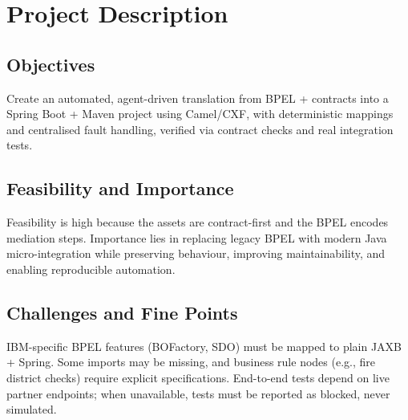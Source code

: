 \documentclass[11pt,a4paper]{article}
\begin{document}
\section{Project Description}
\subsection{Objectives}
Create an automated, agent-driven translation from BPEL + contracts into a Spring Boot + Maven project using Camel/CXF, with deterministic mappings and centralised fault handling, verified via contract checks and real integration tests.

\subsection{Feasibility and Importance}
Feasibility is high because the assets are contract-first and the BPEL encodes mediation steps. Importance lies in replacing legacy BPEL with modern Java micro-integration while preserving behaviour, improving maintainability, and enabling reproducible automation.

\subsection{Challenges and Fine Points}
IBM-specific BPEL features (BOFactory, SDO) must be mapped to plain JAXB + Spring. Some imports may be missing, and business rule nodes (e.g., fire district checks) require explicit specifications. End-to-end tests depend on live partner endpoints; when unavailable, tests must be reported as blocked, never simulated.
\end{document}
